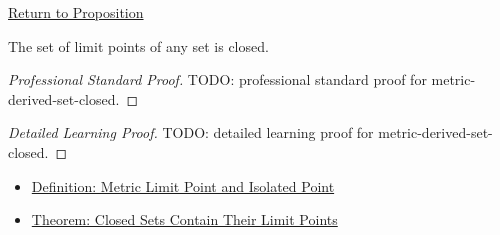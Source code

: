 \newpage
{}
\label{prf:metric-derived-set-closed}

\begin{remark*}[Return]
\hyperref[prop:metric-derived-set-closed]{Return to Proposition}
\end{remark*}

\begin{proposition*}
The set of limit points of any set is closed.
\end{proposition*}

\begin{proof}[Professional Standard Proof]
\LRAProofBodyStart
TODO: professional standard proof for metric-derived-set-closed.
\end{proof}

\begin{proof}[Detailed Learning Proof]
\LRAProofBodyStart
TODO: detailed learning proof for metric-derived-set-closed.
\end{proof}

\begin{remark*}
\end{remark*}

\begin{dependencies}
\begin{itemize}
  \item \hyperref[def:metric-limit-point-isolated-point]{Definition: Metric Limit Point and Isolated Point}
  \item \hyperref[thm:metric-closed-sets-contain-limit-points]{Theorem: Closed Sets Contain Their Limit Points}
\end{itemize}
\end{dependencies}

\clearpage

